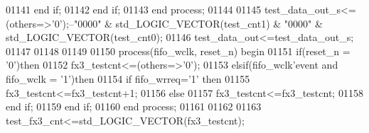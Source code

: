 \begin{DoxyCode}
01141         \textcolor{keywordflow}{end} \textcolor{keywordflow}{if};
01142     \textcolor{keywordflow}{end} \textcolor{keywordflow}{if}; 
01143 \textcolor{keywordflow}{end} \textcolor{keywordflow}{process}; 
01144 
01145 \textcolor{vhdlchar}{test_data_out_s}\textcolor{vhdlchar}{<=}\textcolor{vhdlchar}{(}\textcolor{keywordflow}{others}\textcolor{vhdlchar}{=}\textcolor{vhdlchar}{>}\textcolor{vhdlchar}{'}\textcolor{vhdllogic}{}\textcolor{vhdllogic}{0}\textcolor{vhdlchar}{'}\textcolor{vhdlchar}{)};\textcolor{keyword}{--"0000" & std\_LOGIC\_VECTOR(test\_cnt1) & "0000" &
       std\_LOGIC\_VECTOR(test\_cnt0);}
01146 \textcolor{vhdlchar}{test_data_out}\textcolor{vhdlchar}{<=}\textcolor{vhdlchar}{test_data_out_s};
01147 
01148 
01149 
01150 \textcolor{keywordflow}{process}(fifo_wclk, reset_n) \textcolor{keywordflow}{begin}
01151     \textcolor{keywordflow}{if}\textcolor{vhdlchar}{(}\textcolor{vhdlchar}{reset_n} \textcolor{vhdlchar}{=} \textcolor{vhdlchar}{'}\textcolor{vhdllogic}{}\textcolor{vhdllogic}{0}\textcolor{vhdlchar}{'}\textcolor{vhdlchar}{)}\textcolor{keywordflow}{then}
01152         \textcolor{vhdlchar}{fx3_testcnt}\textcolor{vhdlchar}{<=}\textcolor{vhdlchar}{(}\textcolor{keywordflow}{others}\textcolor{vhdlchar}{=}\textcolor{vhdlchar}{>}\textcolor{vhdlchar}{'}\textcolor{vhdllogic}{}\textcolor{vhdllogic}{0}\textcolor{vhdlchar}{'}\textcolor{vhdlchar}{)};
01153     \textcolor{keywordflow}{elsif}\textcolor{vhdlchar}{(}\textcolor{vhdlchar}{fifo_wclk}\textcolor{vhdlchar}{'}\textcolor{vhdlkeyword}{event} \textcolor{keywordflow}{and} \textcolor{vhdlchar}{fifo_wclk} \textcolor{vhdlchar}{=} \textcolor{vhdlchar}{'}\textcolor{vhdllogic}{}\textcolor{vhdllogic}{1}\textcolor{vhdlchar}{'}\textcolor{vhdlchar}{)}\textcolor{keywordflow}{then}
01154         \textcolor{keywordflow}{if} \textcolor{vhdlchar}{fifo_wrreq}\textcolor{vhdlchar}{=}\textcolor{vhdlchar}{'}\textcolor{vhdllogic}{}\textcolor{vhdllogic}{1}\textcolor{vhdlchar}{'} \textcolor{keywordflow}{then} 
01155             \textcolor{vhdlchar}{fx3_testcnt}\textcolor{vhdlchar}{<=}\textcolor{vhdlchar}{fx3_testcnt}\textcolor{vhdlchar}{+}\textcolor{vhdllogic}{}\textcolor{vhdllogic}{1};
01156             \textcolor{keywordflow}{else}
01157             \textcolor{vhdlchar}{fx3_testcnt}\textcolor{vhdlchar}{<=}\textcolor{vhdlchar}{fx3_testcnt};
01158         \textcolor{keywordflow}{end} \textcolor{keywordflow}{if};
01159     \textcolor{keywordflow}{end} \textcolor{keywordflow}{if}; 
01160 \textcolor{keywordflow}{end} \textcolor{keywordflow}{process}; 
01161 
01162 
01163 \textcolor{vhdlchar}{test_fx3_cnt}\textcolor{vhdlchar}{<=}\textcolor{comment}{std\_LOGIC\_VECTOR}\textcolor{vhdlchar}{(}\textcolor{vhdlchar}{fx3_testcnt}\textcolor{vhdlchar}{)}; 

\end{DoxyCode}
